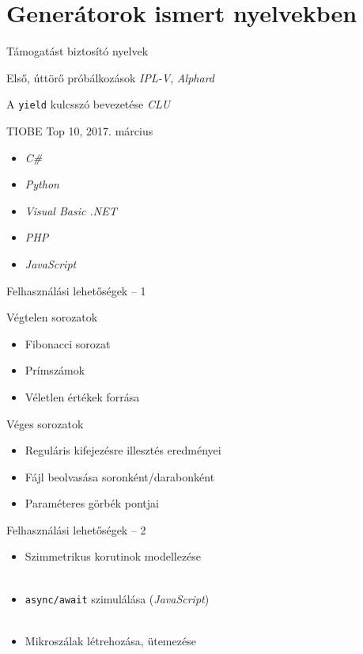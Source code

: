 \section{Generátorok ismert nyelvekben}

\begin{frame}{Támogatást biztosító nyelvek}
    \begin{block}{Első, úttörő próbálkozások}
        \indent\textit{IPL-V}, \textit{Alphard}
    \end{block}
    \begin{block}{A \texttt{yield} kulcsszó bevezetése}
        \textit{CLU}
    \end{block}
    \begin{block}{TIOBE Top 10, 2017. március}
        \begin{itemize}
            \item
            \textit{C\#}
            \item
            \textit{Python}
            \item
            \textit{Visual Basic .NET}
            \item
            \textit{PHP}
            \item
            \textit{JavaScript}
        \end{itemize}
    \end{block}
\end{frame}


\begin{frame}{Felhasználási lehetőségek -- 1}
\begin{block}{Végtelen sorozatok}
    \begin{itemize}
        \item
        Fibonacci sorozat
        \item
        Prímszámok
        \item
        Véletlen értékek forrása
    \end{itemize}
\end{block}
\begin{block}{Véges sorozatok}
    \begin{itemize}
        \item
        Reguláris kifejezésre illesztés eredményei
        \item
        Fájl beolvasása soronként/darabonként
        \item
        Paraméteres görbék pontjai
    \end{itemize}
\end{block}
\end{frame}


\begin{frame}{Felhasználási lehetőségek -- 2}
\begin{itemize}
    \item
    Szimmetrikus korutinok modellezése \\
    \hfill \\
    \item
    \texttt{async/await} szimulálása (\textit{JavaScript}) \\
    \hfill \\
    \item
    Mikroszálak létrehozása, ütemezése
\end{itemize}
\end{frame}
